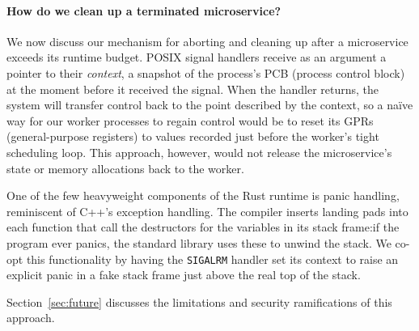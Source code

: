 \paragraph{How do we clean up a terminated microservice?}
We now discuss our mechanism for aborting and cleaning up after a microservice
exceeds its runtime budget.  POSIX signal handlers receive as an argument a pointer to their
\textit{context}, a snapshot of the process's PCB (process control block) at the
moment before it received the signal.  When the handler returns, the system will
transfer control back to the point described by the context, so a naïve way for our
worker processes to regain control would be to reset its GPRs (general-purpose
registers) to values recorded just before the worker's tight scheduling loop.
This approach, however, would not release the microservice's state or memory
allocations back to the worker.

One of the few heavyweight components of the Rust runtime is panic handling,
reminiscent of C++'s exception handling.  The compiler inserts landing pads into each
function that call the destructors for the variables in its stack frame:\@ if the
program ever panics, the standard library uses these to unwind the stack.  We co-opt
this functionality by having the \texttt{SIGALRM} handler set its context to raise an
explicit panic in a fake stack frame just above the real top of the stack.

Section~\ref{sec:future} discusses the limitations and security ramifications of
this approach.

